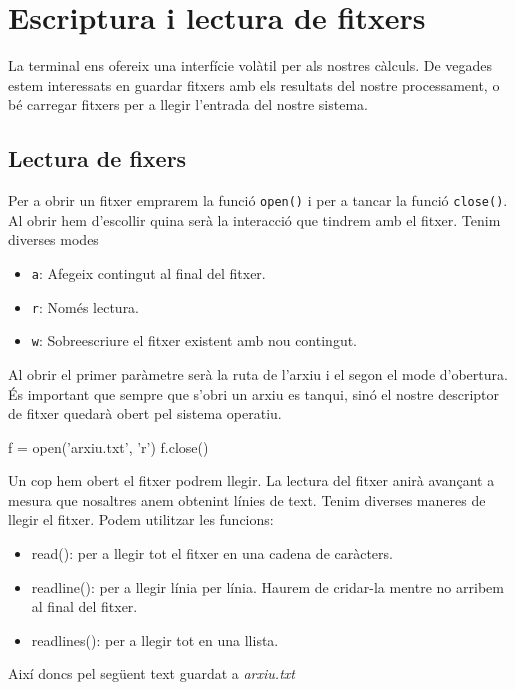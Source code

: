 \chapter{Escriptura i lectura de fitxers}

La terminal ens ofereix una interfície volàtil per als nostres càlculs. De vegades estem interessats en guardar fitxers amb els resultats del nostre processament, o bé carregar fitxers per a llegir l'entrada del nostre sistema.

\section{Lectura de fixers}

Per a obrir un fitxer emprarem la funció {\tt open()} i per a tancar la funció {\tt close()}. Al obrir hem d'escollir quina serà la interacció que tindrem amb el fitxer. Tenim diverses modes 

\begin{itemize}
\item {\tt a}: Afegeix contingut al final del fitxer.
\item {\tt r}: Només lectura.
\item {\tt w}: Sobreescriure el fitxer existent amb nou contingut.
\end{itemize}

Al obrir el primer paràmetre serà la ruta de l'arxiu i el segon el mode d'obertura. És important que sempre que s'obri un arxiu es tanqui, sinó el nostre descriptor de fitxer quedarà obert pel sistema operatiu.

\begin{blockcode}
f = open('arxiu.txt', 'r')
f.close()
\end{blockcode}

Un cop hem obert el fitxer podrem llegir. La lectura del fitxer anirà avançant a mesura que nosaltres anem obtenint línies de text. Tenim diverses maneres de llegir el fitxer. Podem utilitzar les funcions: 

\begin{itemize}
\item read(): per a llegir tot el fitxer en una cadena de caràcters.
\item readline(): per a llegir línia per línia. Haurem de cridar-la mentre no arribem al final del fitxer.
\item readlines(): per a llegir tot en una llista.
\end{itemize}

Així doncs pel següent text guardat a \emph{arxiu.txt}

